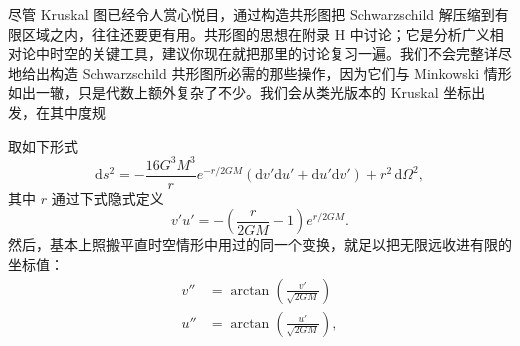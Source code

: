 尽管 Kruskal 图已经令人赏心悦目，通过构造共形图把 Schwarzschild 解压缩到有限区域之内，往往还要更有用。共形图的思想在附录 H 中讨论；它是分析广义相对论中时空的关键工具，建议你现在就把那里的讨论复习一遍。我们不会完整详尽地给出构造 Schwarzschild 共形图所必需的那些操作，因为它们与 Minkowski 情形如出一辙，只是代数上额外复杂了不少。我们会从类光版本的 Kruskal 坐标出发，在其中度规


取如下形式
\begin{equation*}
\mathrm{d}s^2 = -\frac{16G^3M^3}{r}e^{-r/2GM}\left(\mathrm{d}v'\mathrm{d}u' + \mathrm{d}u'\mathrm{d}v'\right) + r^2\,\mathrm{d}\Omega^2,
\tag{5.130}
\end{equation*}
其中 $r$ 通过下式隐式定义
\begin{equation*}
v'u' = -\left(\frac{r}{2GM} - 1\right)e^{r/2GM}.
\tag{5.131}
\end{equation*}
然后，基本上照搬平直时空情形中用过的同一个变换，就足以把无限远收进有限的坐标值：
\begin{align*}
v'' &= \arctan\left(\frac{v'}{\sqrt{2GM}}\right)\\
u'' &= \arctan\left(\frac{u'}{\sqrt{2GM}}\right),
\tag{5.132}
\end{align*}

